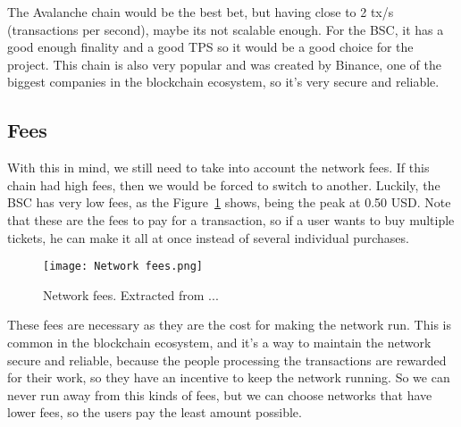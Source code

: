 The Avalanche chain would be the best bet, but having close to 2 tx/s
(transactions per second), maybe its not scalable enough. For the BSC, it has a
good enough finality and a good TPS so it would be a good choice for the
project. This chain is also very popular and was created by Binance, one of the
biggest companies in the blockchain ecosystem, so it's very secure and
reliable.

\subsection{Fees}
\label{subsec:fees}

With this in mind, we still need to take into account the network fees. If this
chain had high fees, then we would be forced to switch to another. Luckily, the
BSC has very low fees, as the Figure~\ref{fig:network_fees} shows, being the
peak at 0.50 USD. Note that these are the fees to pay for a transaction, so if
a user wants to buy multiple tickets, he can make it all at once instead of
several individual purchases.

\begin{figure}[H]
    \texttt{[image: Network fees.png]}
    \centering
    \caption{Network fees. Extracted from ...}
    \label{fig:network_fees}
\end{figure}

These fees are necessary as they are the cost for making the network run. This
is common in the blockchain ecosystem, and it's a way to maintain the network
secure and reliable, because the people processing the transactions are
rewarded for their work, so they have an incentive to keep the network running.
So we can never run away from this kinds of fees, but we can choose networks
that have lower fees, so the users pay the least amount possible.
